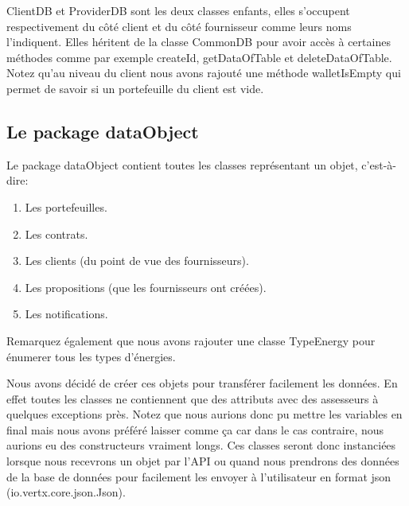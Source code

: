 \begin{flushleft}
ClientDB et ProviderDB sont les deux classes enfants, elles s'occupent respectivement du côté client et du côté fournisseur comme leurs noms l'indiquent. Elles héritent de la classe CommonDB pour avoir accès à certaines méthodes comme par exemple createId, getDataOfTable et deleteDataOfTable. Notez qu'au niveau du client nous avons rajouté une méthode walletIsEmpty qui permet de savoir si un portefeuille du client est vide.
\end{flushleft}

\subsection{Le package dataObject}

\begin{flushleft}
Le package dataObject contient toutes les classes représentant un objet, c'est-à-dire:
\end{flushleft}

\begin{enumerate}[-]
\item Les portefeuilles.
\item Les contrats.
\item Les clients (du point de vue des fournisseurs).
\item Les propositions (que les fournisseurs ont créées).
\item Les notifications.
\end{enumerate}

\begin{flushleft}
Remarquez également que nous avons rajouter une classe TypeEnergy pour énumerer tous les types d'énergies.
\end{flushleft}

\begin{flushleft}
Nous avons décidé de créer ces objets pour transférer facilement les données. En effet toutes les classes ne contiennent que des attributs avec des assesseurs à quelques exceptions près. Notez que nous aurions donc pu mettre les variables en final mais nous avons préféré laisser comme ça car dans le cas contraire, nous aurions eu des constructeurs vraiment longs. Ces classes seront donc instanciées lorsque nous recevrons un objet par l'API ou quand nous prendrons des données de la base de données pour facilement les envoyer à l'utilisateur en format json (io.vertx.core.json.Json).
\end{flushleft}


